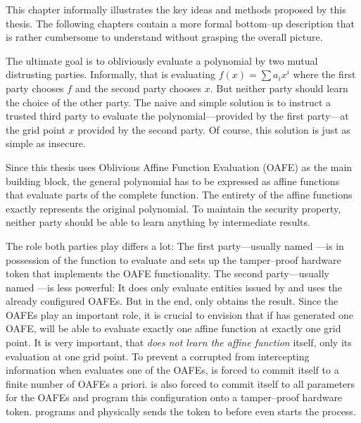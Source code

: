 \label{sec:methods}

%
%
\label{sec:illustration}

This chapter informally illustrates the key ideas and methods proposed by this
thesis. The following chapters contain a more formal bottom--up description that
is rather cumbersome to understand without grasping the overall picture.

The ultimate goal is to obliviously evaluate a polynomial by two mutual
distrusting parties. Informally, that is evaluating $f(x) = \sum a_ix^i$ where
the first party chooses $f$ and the second party chooses $x$. But neither
party should learn the choice of the other party. The naive and simple solution
is to instruct a trusted third party to evaluate the polynomial---provided by
the first party---at the grid point $x$ provided by the second party.
Of course, this solution is just as simple as insecure.

Since this thesis uses Oblivious Affine Function Evaluation
(OAFE)\cite{davidgoliath} as the main building block, the general polynomial has
to be expressed as affine functions that evaluate parts of the complete
function. The entirety of the affine functions exactly represents the original
polynomial. To maintain the security property, neither party should be able to
learn anything by intermediate results.

The role both parties play differs a lot: The first party---usually named
\JWpOne{}---is in possession of the function to evaluate and sets up the
tamper--proof hardware token that implements the OAFE functionality. The second
party---usually named \JWpTwo{}---is less powerful: It does only evaluate
entities issued by \JWpOne{} and uses the already configured OAFEs. But in the
end, only \JWpTwo{} obtains the result.  Since the OAFEs play an important role,
it is crucial to envision that if \JWpOne{} has generated one OAFE, \JWpTwo{}
will be able to evaluate exactly one affine function at exactly one grid point.
It is very important, that \JWpTwo{} \emph{does not learn the affine function}
itself, only its evaluation at one grid point. To prevent a corrupted \JWpOne{}
from intercepting information when \JWpTwo{} evaluates one of the OAFEs,
\JWpOne{} is forced to commit itself to a finite number of OAFEs a priori.
\JWpOne{} is also forced to commit itself to all parameters for the OAFEs and
program this configuration onto a tamper--proof hardware token. \JWpOne{}
programs and physically sends the token to \JWpTwo{} before \JWpTwo{} even
starts the process.

